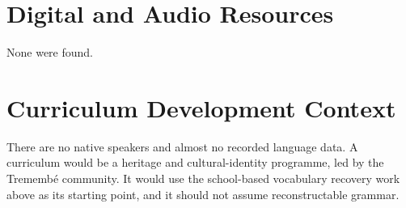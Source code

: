 \documentclass[12pt]{article}
\begin{document}
\section{Digital and Audio Resources}
None were found.

\section{Curriculum Development Context}
There are no native speakers and almost no recorded language data. A curriculum would be a heritage and cultural-identity programme, led by the Tremembé community. It would use the school-based vocabulary recovery work above as its starting point, and it should not assume reconstructable grammar.
\end{document}
